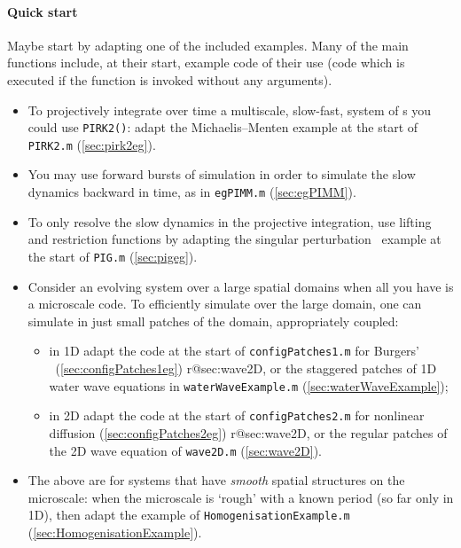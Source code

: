 \paragraph{Quick start}
Maybe start by adapting one of the included examples. Many of the main functions include, at their start, example code of their use (code which is executed if the function is invoked without any arguments).
\begin{itemize}
\item To projectively integrate over time a multiscale, slow-fast, system of \ode{}s you could use \verb|PIRK2()|: adapt the Michaelis--Menten example at the start of \verb|PIRK2.m| (\cref{sec:pirk2eg}).
\item You may use forward bursts of simulation in order to simulate the slow dynamics backward in time, as in \verb|egPIMM.m| (\cref{sec:egPIMM}).
\item To only resolve the slow dynamics in the projective integration, use lifting and restriction functions by adapting the singular perturbation \ode\ example at the start of \verb|PIG.m| (\cref{sec:pigeg}).
\item Consider an evolving system over a large spatial domains when all you have is a microscale code.  To efficiently simulate over the large domain, one can simulate in just small patches of the domain, appropriately coupled:
\begin{itemize}
\item in 1D adapt the code at the start of \verb|configPatches1.m| for Burgers' \pde\ (\cref{sec:configPatches1eg})%
\ifcsname r@sec:wave2D\endcsname, or the staggered patches of 1D water wave equations in \verb|waterWaveExample.m| (\cref{sec:waterWaveExample})\fi;
\item in 2D adapt the code at the start of \verb|configPatches2.m| for nonlinear diffusion (\cref{sec:configPatches2eg})%
\ifcsname r@sec:wave2D\endcsname, or the regular patches of the 2D wave equation of \verb|wave2D.m| (\cref{sec:wave2D})\fi.
\end{itemize}
\item The above are for systems that have \emph{smooth} spatial structures on the microscale: when the microscale is `rough' with a known period (so far only in 1D), then adapt 
the example of \verb|HomogenisationExample.m| (\cref{sec:HomogenisationExample}).
\end{itemize}


